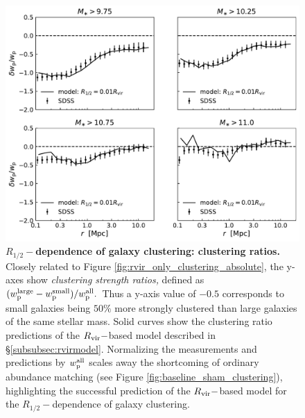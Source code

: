 \documentclass[usenatbib,usegraphicx,letterpaper]{mn2e}
\newcommand{\rhalf}{R_{1/2}}
\newcommand{\rvir}{R_{\rm vir}}
\begin{document}
\begin{figure}
\centering
\includegraphics[width=12cm]{FIGS/rvir_only_wp_ratios.pdf}
\caption{
{\bf $\rhalf-$dependence of galaxy clustering: clustering ratios.}
Closely related to Figure \ref{fig:rvir_only_clustering_absolute}, the y-axes show {\em clustering strength ratios,} defined as $(w_{\rm p}^{\rm large} - w_{\rm p}^{\rm small})/w_{\rm p}^{\rm all}.$ Thus a y-axis value of $-0.5$ corresponds to small galaxies being $50\%$ more strongly clustered than large galaxies of the same stellar mass. Solid curves show the clustering ratio predictions of the $\rvir-$based model described in \S\ref{subsubsec:rvirmodel}. Normalizing the measurements and predictions by $w_{\rm p}^{\rm all}$ scales away the shortcoming of ordinary abundance matching (see Figure \ref{fig:baseline_sham_clustering}), highlighting the successful prediction of the $\rvir-$based model for the $\rhalf-$dependence of galaxy clustering.
}
\label{fig:clustering_ratio_upshot}
\end{figure}
\end{document}
